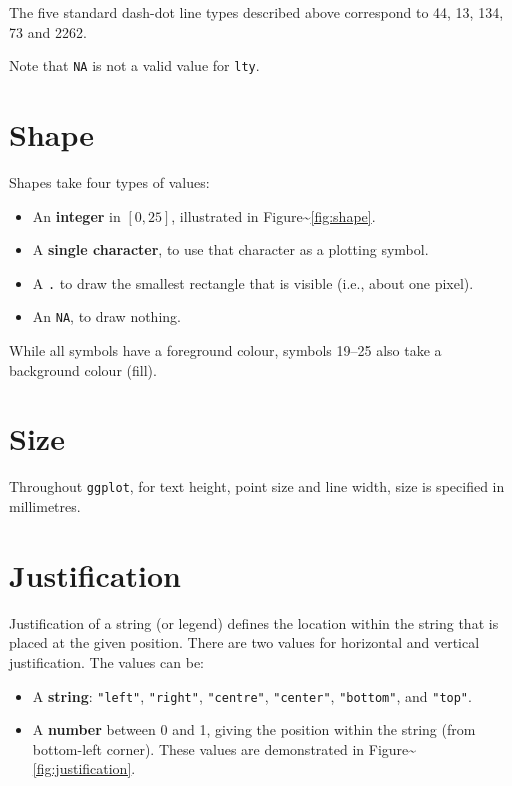 The five standard dash-dot line types described above correspond to 44,
13, 134, 73 and 2262.

Note that \texttt{NA} is not a valid value for \texttt{lty}.

\section{Shape}\label{sec:shape-spec}

Shapes take four types of values: 

\begin{itemize}
\itemsep1pt\parskip0pt
\item
  An \textbf{integer} in \([0, 25]\), illustrated in
  Figure\textasciitilde{}\ref{fig:shape}.
\item
  A \textbf{single character}, to use that character as a plotting
  symbol.\\
\item
  A \texttt{.} to draw the smallest rectangle that is visible (i.e.,
  about one pixel).
\item
  An \texttt{NA}, to draw nothing.
\end{itemize}

While all symbols have a foreground colour, symbols 19--25 also take a
background colour (fill).

\section{Size}\label{sec:size}

Throughout \texttt{ggplot}, for text height, point size and line width,
size is specified in millimetres. 

\section{Justification}\label{sec:justification-spec}

Justification of a string (or legend) defines the location within the
string that is placed at the given position. There are two values for
horizontal and vertical justification. The values can be:
  

\begin{itemize}
\itemsep1pt\parskip0pt
\item
  A \textbf{string}: \texttt{"left"}, \texttt{"right"},
  \texttt{"centre"}, \texttt{"center"}, \texttt{"bottom"}, and
  \texttt{"top"}.
\item
  A \textbf{number} between 0 and 1, giving the position within the
  string (from bottom-left corner). These values are demonstrated in
  Figure\textasciitilde{}\ref{fig:justification}.
\end{itemize}

